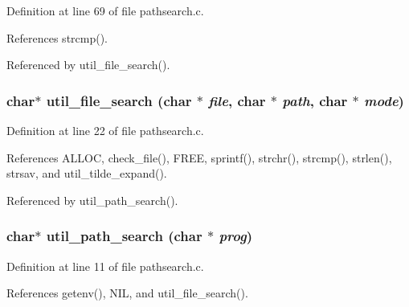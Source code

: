 Definition at line 69 of file pathsearch.c.

References strcmp().

Referenced by util\_\-file\_\-search().
\subsubsection{\setlength{\rightskip}{0pt plus 5cm}char$\ast$ util\_\-file\_\-search (char $\ast$ {\em file}, char $\ast$ {\em path}, char $\ast$ {\em mode})}\label{pathsearch_8c_bee2fc89d4bec5909d1dc0673c786bff}




Definition at line 22 of file pathsearch.c.

References ALLOC, check\_\-file(), FREE, sprintf(), strchr(), strcmp(), strlen(), strsav, and util\_\-tilde\_\-expand().

Referenced by util\_\-path\_\-search().
\subsubsection{\setlength{\rightskip}{0pt plus 5cm}char$\ast$ util\_\-path\_\-search (char $\ast$ {\em prog})}\label{pathsearch_8c_1e7bd784b3f1c629b1150b0726eba7f3}




Definition at line 11 of file pathsearch.c.

References getenv(), NIL, and util\_\-file\_\-search().